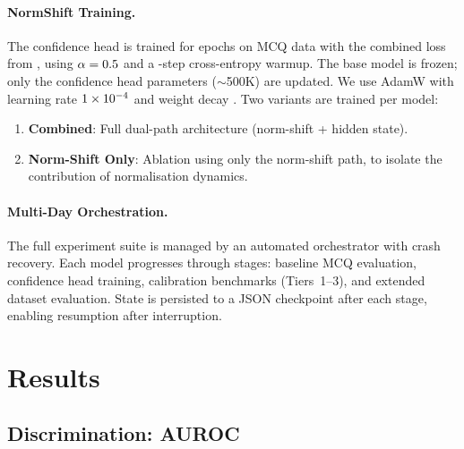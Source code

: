 \documentclass[11pt,a4paper]{article}
\begin{document}
\paragraph{NormShift Training.}
The confidence head is trained for \expEpochs{} epochs on MCQ data with the
combined loss from , using $\alpha = 0.5{}$ and a
\expWarmupSteps{}-step cross-entropy warmup.  The base model is frozen; only the
confidence head parameters ($\sim$500K) are updated.  We use AdamW with
learning rate $1 \times 10^{-4}{}$ and weight decay \expWeightDecay{}.  Two variants
are trained per model:
\begin{enumerate}[nosep]
  \item \textbf{Combined}: Full dual-path architecture (norm-shift +
        hidden state).
  \item \textbf{Norm-Shift Only}: Ablation using only the norm-shift
        path, to isolate the contribution of normalisation dynamics.
\end{enumerate}

\paragraph{Multi-Day Orchestration.}
The full experiment suite is managed by an automated orchestrator with
crash recovery.  Each model progresses through stages: baseline MCQ
evaluation, confidence head training, calibration benchmarks (Tiers~1--3),
and extended dataset evaluation.  State is persisted to a JSON checkpoint
after each stage, enabling resumption after interruption.


\section{Results}
\label{sec:results}

\subsection{Discrimination: AUROC}
\end{document}
